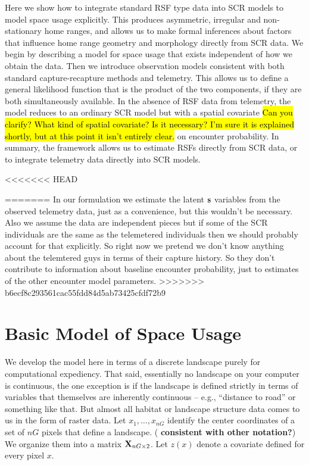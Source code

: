 Here we show how to integrate standard RSF type data into SCR models
to model space usage explicitly. This produces asymmetric, irregular
and non-stationary home ranges, and allows us to make formal
inferences about factors that influence home range geometry and
morphology directly from SCR data.  We begin by describing a model for
space usage that exists independent of how we obtain the data. Then we
introduce observation models consistent with both standard
capture-recapture methods and telemetry.  This allows us to define a
general likelihood function that is the product of the two
components, if they are both simultaneously available.  In the absence
of RSF data from telemetry, the model reduces to an ordinary SCR model
but with a spatial covariate
\hl{ Can you clarify? What kind of spatial covariate? Is it necessary?
I'm sure it is explained shortly, but at this point it isn't entirely clear.}
on encounter probability.  In summary,
the framework allows us to estimate RSFs directly from SCR data, or to
integrate telemetry data directly into SCR models.


<<<<<<< HEAD

=======
In our formulation we estimate the latent ${\bf s}$ variables from the observed telemetry
data, just as a convenience, but this wouldn't be necessary.
Also we assume the data are independent pieces but if some of the SCR
individuals are the same as the telemetered individuals then we should
probably account for that explicitly. So right now we pretend we don't
know anything about the telemtered guys in terms of their capture
history. So they don't contribute to information about baseline
encounter probability, just to estimates of the other encounter model
parameters.
>>>>>>> b6ecf8c293561cac55fdd84d5ab73425cfdf72b9



\section{Basic Model of Space Usage}
\label{rsf.sec.rsfmodel}

We develop the model here in terms of a discrete landscape purely for
computational expediency. That said, essentially no landscape on your
computer is continuous, the one exception is if the landscape is
defined strictly in terms of variables that themselves are inherently
continuous -- e.g., ``distance to road'' or something like that.  But
almost all habitat or landscape structure data comes to us in the form
of raster data.  Let $x_{1},\ldots,x_{nG}$ identify the center
coordinates of a set of $nG$ pixels that define a landscape. ({\bf
  consistent with other notation?}) We organize them into a matrix
${\bf X}_{nG \times 2}$.  Let $z(x)$ denote a covariate defined for
every pixel $x$.

